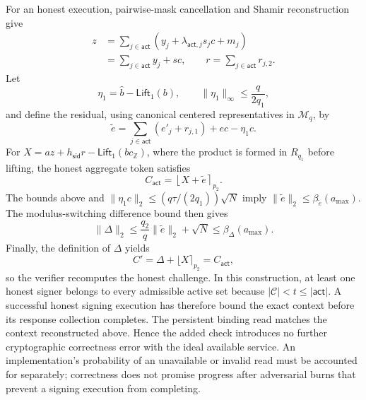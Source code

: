 \documentclass[lettersize,journal]{IEEEtran}
\begin{document}
	For an honest execution, pairwise-mask cancellation and Shamir reconstruction
	give
	\[
	\begin{aligned}
		z
		&=
		\sum_{j\in\mathsf{act}}
		\left(y_j+\lambda_{\mathsf{act},j}s_jc+m_j\right)\\
		&=
		\sum_{j\in\mathsf{act}}y_j+sc,
		\qquad
		r=\sum_{j\in\mathsf{act}}r_{j,2}.
	\end{aligned}
	\]
	Let
	\[
	\eta_1
	=
	\widehat b-\mathsf{Lift}_1(b),
	\qquad
	\|\eta_1\|_\infty\leq\frac{q}{2q_1},
	\]
	and define the residual, using canonical centered representatives in
	$\mathcal M_q$, by
	\[
	\widetilde e
	=
	\sum_{j\in\mathsf{act}}(e'_j+r_{j,1})
	+ec-\eta_1c.
	\]
	For
	$X=az+h_{\mathsf{sid}}r-\mathsf{Lift}_1(bc_{\mathbb Z})$, where the product
	is formed in $R_{q_1}$ before lifting, the honest aggregate token
	satisfies
	\[
	C_{\mathsf{act}}
	=
	\left\lfloor X+\widetilde e\right\rceil_{p_2}.
	\]
	The bounds above and
	$\|\eta_1c\|_2\leq(q\tau/(2q_1))\sqrt N$ imply
	$\|\widetilde e\|_2\leq\beta_{\widetilde e}(a_{\max})$. The modulus-switching
	difference bound then gives
	\[
	\|\Delta\|_2
	\leq
	\frac{q_2}{q}\|\widetilde e\|_2+\sqrt N
	\leq
	\beta_\Delta(a_{\max}).
	\]
	Finally, the definition of $\Delta$ yields
	\[
	C'
	=
	\Delta+\lfloor X\rceil_{p_2}
	=
	C_{\mathsf{act}},
	\]
	so the verifier recomputes the honest challenge.
	In this construction, at least one honest signer belongs to every admissible active
	set because $|\mathcal C|<t\leq|\mathsf{act}|$. A successful honest signing
	execution has therefore bound the exact context before its response
	collection completes. The persistent binding read matches the context
	reconstructed above. Hence the added check introduces no further
	cryptographic correctness error with the ideal available service.
	An implementation's probability of an unavailable or invalid read must be
	accounted for separately; correctness does not promise progress after
	adversarial burns that prevent a signing execution from completing.
	
\end{document}
